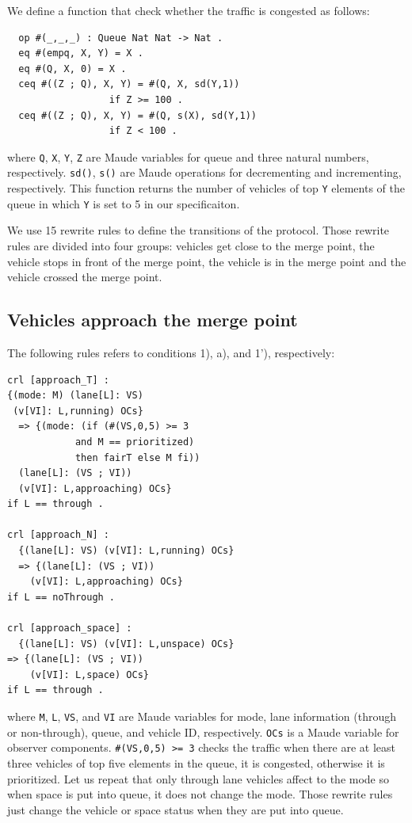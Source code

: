 \documentclass[10pt, conference, compsocconf]{IEEEtran}
\begin{document}
 We define a function that check whether the traffic is congested as follows:
 \begin{small}
  \begin{verbatim}
  op #(_,_,_) : Queue Nat Nat -> Nat .
  eq #(empq, X, Y) = X .
  eq #(Q, X, 0) = X .
  ceq #((Z ; Q), X, Y) = #(Q, X, sd(Y,1)) 
                  if Z >= 100 .
  ceq #((Z ; Q), X, Y) = #(Q, s(X), sd(Y,1)) 
                  if Z < 100 .
  \end{verbatim}
  \end{small}
\noindent where \verb!Q!, \verb!X!, \verb!Y!, \verb!Z! are Maude variables 
for queue and three natural numbers, respectively. \verb!sd()!, \verb!s()! are 
Maude operations for decrementing and incrementing, respectively.
This function returns the number of vehicles of top \verb!Y! elements of the queue
in which \verb!Y! is set to 5 in our specificaiton. 
 
We use 15 rewrite rules to define the transitions of the protocol.
Those rewrite rules are divided into four groups: vehicles get close to the merge point,
the vehicle stops in front of the merge point, the vehicle is in the merge point and 
the vehicle crossed the merge point.

\subsection{Vehicles approach the merge point}
The following rules refers to conditions 1), a), and 1'), respectively:
\begin{small}
  \begin{verbatim}
crl [approach_T] : 
{(mode: M) (lane[L]: VS) 
 (v[VI]: L,running) OCs} 
  => {(mode: (if (#(VS,0,5) >= 3 
            and M == prioritized) 
            then fairT else M fi))
  (lane[L]: (VS ; VI)) 
  (v[VI]: L,approaching) OCs} 
if L == through .

crl [approach_N] : 
  {(lane[L]: VS) (v[VI]: L,running) OCs} 
  => {(lane[L]: (VS ; VI)) 
    (v[VI]: L,approaching) OCs} 
if L == noThrough .

crl [approach_space] : 
  {(lane[L]: VS) (v[VI]: L,unspace) OCs} 
=> {(lane[L]: (VS ; VI)) 
    (v[VI]: L,space) OCs} 
if L == through .
  \end{verbatim}
\end{small}

\noindent where \verb!M!, \verb!L!, \verb!VS!, and \verb!VI! 
are Maude variables for mode, lane information (through or non-through), queue, and vehicle ID, respectively.
\verb!OCs! is a Maude variable for observer components.
\verb!#(VS,0,5) >= 3! checks the traffic when there are at least three
vehicles of top five elements in the queue, it is congested, otherwise 
it is prioritized. Let us repeat that only through lane vehicles affect
to the mode so when space is put into queue, it does not change the mode.
Those rewrite rules just change the vehicle or space status when they are put into queue.
\end{document}
